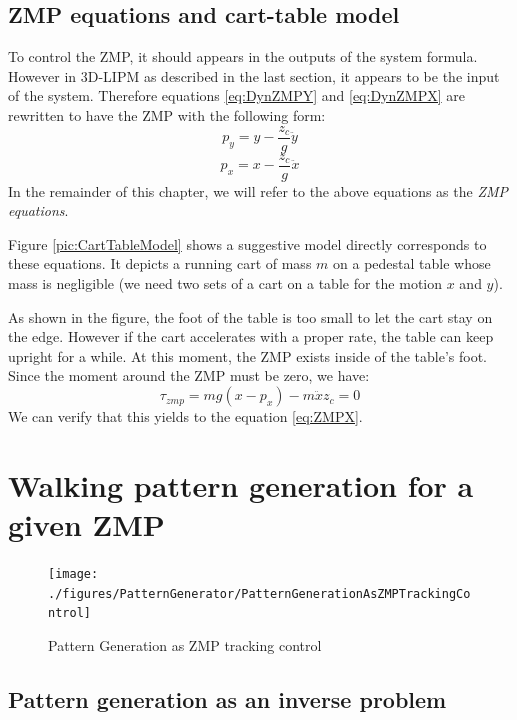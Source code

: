 \subsection{ZMP equations and cart-table model}
To control the ZMP, it should appears in the outputs of the system formula.
However in 3D-LIPM as described in the last section, it appears to
be the input of the system. Therefore equations \ref{eq:DynZMPY} and \ref{eq:DynZMPX}
are rewritten to have the ZMP with the following form:
\begin{equation}
p_y = y - \frac{z_c}{g} \ddot{y}
\label{eq:ZMPY}
\end{equation}
\begin{equation}
p_x = x - \frac{z_c}{g} \ddot{x}
\label{eq:ZMPX}
\end{equation}
In the remainder of this chapter, we will refer to the above equations as the \textit{ZMP equations}.
\par
Figure \ref{pic:CartTableModel} shows a suggestive model directly corresponds to these equations.
It depicts a running cart of mass $m$ on a pedestal  table whose mass
is negligible (we need two sets of a cart on a table for the motion $x$ and $y$).
\par
As shown in the figure, the foot of the table is too small to let the cart stay on the edge.
However if the cart accelerates with a proper rate, the table can keep upright for
a while. At this moment, the ZMP exists inside of the table's foot.
Since the moment around the ZMP must be zero, we have:
\begin{equation}
\tau_{zmp} = mg(x-p_x) - m \ddot{x} z_c = 0
\end{equation}
We can verify that this yields to the equation \ref{eq:ZMPX}.

\section{Walking pattern generation for a given ZMP}
%
\begin{figure}[htb]
\begin{center}
\texttt{[image: ./figures/PatternGenerator/PatternGenerationAsZMPTrackingControl]}
\caption{Pattern Generation as ZMP tracking control}
\label{pic:PatternGenerationAsZMPTrackingControl}
\end{center}
\end{figure}
%
\subsection{Pattern generation as an inverse problem}

